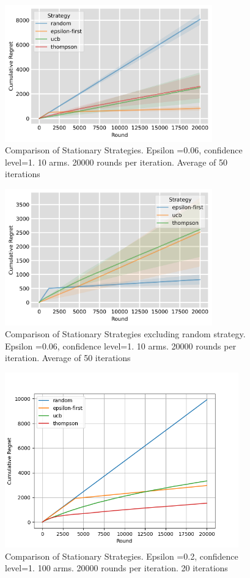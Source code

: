 \begin{figure}[h]
    \centering
    \includegraphics[width=0.8\textwidth]{figures/comparison_of_all_strategies_10_machines}
    \caption[Comparison for 10 arms with random]{Comparison of Stationary Strategies. Epsilon =0.06, confidence level=1. 10 arms. 20000 rounds per iteration. Average of 50 iterations}
    \label{fig:ten_arms_all_strategies}
\end{figure}

\begin{figure}[h]
    \centering
    \includegraphics[width=0.8\textwidth]{figures/comaprison_without_random_10_machines}
    \caption[Comparison for 10 arms without random]{Comparison of Stationary Strategies excluding random strategy. Epsilon =0.06, confidence level=1. 10 arms. 20000 rounds per iteration. Average of 50 iterations}
    \label{fig: 10 machine without random}
\end{figure}

\begin{figure}[h]
    \centering
    \includegraphics[width=0.9\textwidth]{figures/100machines}
    \caption[Comparison for 100 arms]{Comparison of Stationary Strategies. Epsilon =0.2, confidence level=1. 100 arms. 20000 rounds per iteration. 20 iterations}
    \label{fig: all4}
\end{figure}